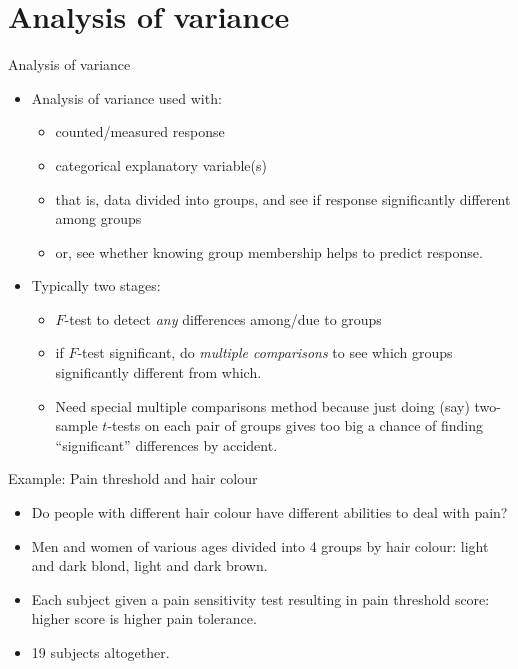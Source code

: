 \section{Analysis of variance}
\frame{\sectionpage}

\begin{frame}[fragile]{Analysis of variance}

  \begin{itemize}
  \item Analysis of variance used with:
    \begin{itemize}
    \item counted/measured response
    \item categorical explanatory variable(s)
    \item that is, data divided into groups, and see if response significantly different among groups
    \item or, see whether knowing group membership helps to predict response.
    \end{itemize}
  \item Typically two stages:
    \begin{itemize}
    \item $F$-test to detect {\em any} differences among/due to groups
    \item if $F$-test significant, do {\em multiple comparisons} to see which groups significantly different from which.
    \item Need special multiple comparisons method because just doing (say) two-sample $t$-tests on each pair of groups gives too big a chance of finding ``significant'' differences by accident.
    \end{itemize}
  \end{itemize}
  
\end{frame}

\begin{frame}[fragile]{Example: Pain threshold and hair colour}
  
  \begin{itemize}
  \item Do people with different hair colour have different abilities
    to deal with pain?
  \item Men and women of various ages divided into 4 groups by hair
    colour: light and dark blond, light and dark brown.
  \item Each subject given a pain sensitivity test resulting in pain
    threshold score: higher score is higher pain tolerance.
  \item 19 subjects altogether.
  \end{itemize}

\end{frame}

